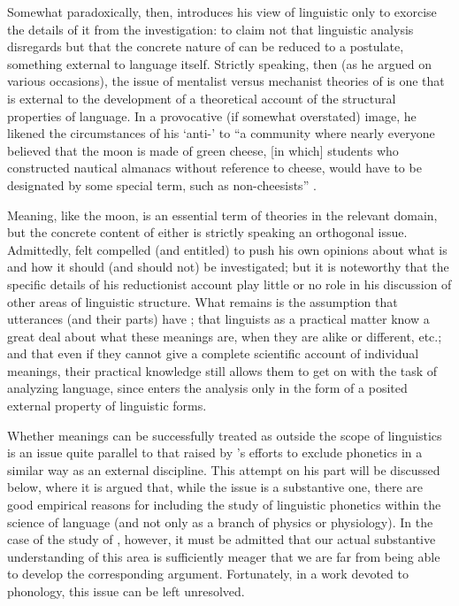 Somewhat paradoxically, then, {\Bloomfield} introduces his view of
linguistic  only to exorcise the details of it from the
investigation: to claim not that linguistic analysis disregards
 but that the concrete nature of  can be reduced to a
postulate, something external to language itself. Strictly speaking,
then (as he argued on various occasions), the issue of mentalist
versus mechanist theories of  is one that is external to the
development of a theoretical account of the structural properties of
language. In a provocative (if somewhat overstated) image, he likened
the circumstances of his `anti-' to ``a community where nearly
everyone believed that the moon is made of green cheese, [in which]
students who constructed nautical almanacs without reference to
cheese, would have to be designated by some special term, such as
non-cheesists'' \citep[49]{bloomfield44:secondary}.

Meaning, like the moon, is an essential term of theories in the
relevant domain, but the concrete content of either is strictly
speaking an orthogonal issue. Admittedly, {\Bloomfield} felt compelled
(and entitled) to push his own opinions about what  is and how
it should (and should not) be investigated; but it is noteworthy that
the specific details of his reductionist account play little or no
role in his discussion of other areas of linguistic structure. What
remains is the assumption that utterances (and their parts) have
; that linguists as a practical matter know a great deal about
what these meanings are, when they are alike or different, etc.; and
that even if they cannot give a complete scientific account of
individual meanings, their practical knowledge still allows them to
get on with the task of analyzing language, since  enters the
analysis only in the form of a posited external property of linguistic
forms.

Whether meanings can be successfully treated as outside the scope of
linguistics is an issue quite parallel to that raised by {\Bloomfield}'s
efforts to exclude phonetics in a similar way as an external
discipline. This attempt on his part will be discussed below, where it
is argued that, while the issue is a substantive one, there are good
empirical reasons for including the study of linguistic phonetics
within the science of language (and not only as a branch of physics or
physiology). In the case of the study of , however, it must be
admitted that our actual substantive understanding of this area is
sufficiently meager that we are far from being able to develop the
corresponding argument. Fortunately, in a work devoted to phonology,
this issue can be left unresolved.

